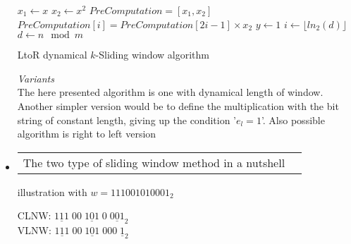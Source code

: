 \begin{itemize}
			\begin{algorithm}[h]
				$x_1 \leftarrow x$	\; 
				$x_2 \leftarrow x^2$	\;
				$PreComputation = [x_1, x_2]$\;			
				{						     
					$PreComputation[i] = PreComputation[2i -1] \times x_2$ \;
				}
				$y \leftarrow 1$	\;
				$i \leftarrow \lfloor ln_2(d)\rfloor $ \;
				{			 
					$d \leftarrow n \mod m $\;
			         
				}				 
				\;
				\caption{LtoR dynamical $k$-Sliding window algorithm}
			\end{algorithm}

		\textit{Variants}\\

			The here presented algorithm is one with dynamical length of window. 
			Another simpler version would be to define the multiplication
			with the bit string of constant length, giving up the condition '$e_l=1$'.
			Also possible algorithm is right to left version

\item 
		\begin{tabularx}{\linewidth}{ p{16cm} p{1.5cm} }
		The two type of sliding window method in a nutshell
		\end{tabularx}
		illustration with $w = 111001010001_2$
		\begin{center}
			CLNW:  $ \underline{111} \; 00 \; \underline{101} \; 0 \; \underline{001}_2$\\
			VLNW:  $ \underline{111} \; 00 \; \underline{101} \; 000 \; \underline{1}_2$
		\end{center}
\end{itemize}